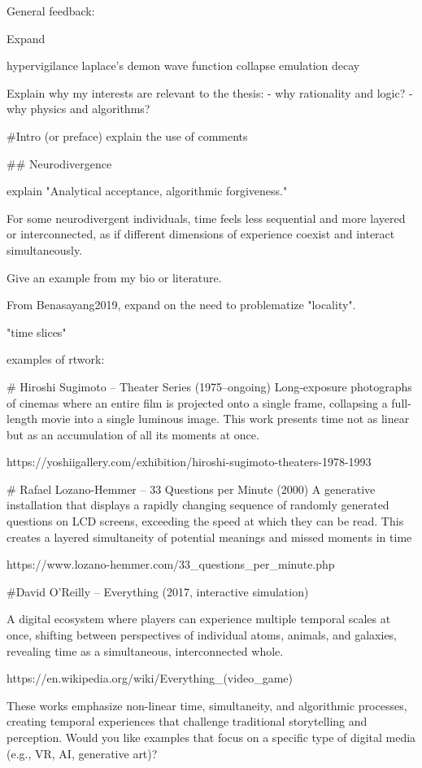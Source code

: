 

General feedback: 

Expand 

hypervigilance
laplace's demon
wave function collapse
emulation
decay

Explain why my interests are relevant to the thesis:  
 - why rationality and logic?
 - why physics and algorithms? 

 
 #Intro (or preface)
 explain the use of comments 


 

## Neurodivergence

explain  "Analytical acceptance, algorithmic forgiveness." 


For some neurodivergent individuals, time feels less
sequential and more layered or interconnected, as if different
dimensions of experience coexist and interact simultaneously.

Give an example from my bio or literature. 

From Benasayang2019, expand on the need to problematize "locality". 


"time slices"

examples of rtwork: 

# Hiroshi Sugimoto – Theater Series (1975–ongoing)
Long-exposure photographs of cinemas where an entire film is projected onto a single frame, collapsing a full-length movie into a single luminous image. This work presents time not as linear but as an accumulation of all its moments at once.

https://yoshiigallery.com/exhibition/hiroshi-sugimoto-theaters-1978-1993


# Rafael Lozano-Hemmer – 33 Questions per Minute (2000)
A generative installation that displays a rapidly changing sequence of randomly generated questions on LCD screens, exceeding the speed at which they can be read. This creates a layered simultaneity of potential meanings and missed moments in time

https://www.lozano-hemmer.com/33_questions_per_minute.php



#David O’Reilly – Everything (2017, interactive simulation)

A digital ecosystem where players can experience multiple temporal scales at once, shifting between perspectives of individual atoms, animals, and galaxies, revealing time as a simultaneous, interconnected whole.

https://en.wikipedia.org/wiki/Everything_(video_game)

These works emphasize non-linear time, simultaneity, and algorithmic processes, creating temporal experiences that challenge traditional storytelling and perception. Would you like examples that focus on a specific type of digital media (e.g., VR, AI, generative art)?
